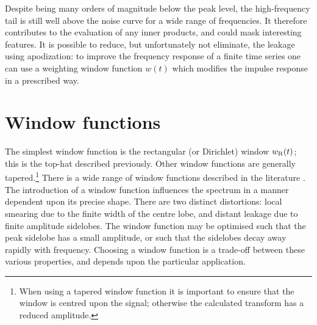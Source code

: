 Despite being many orders of magnitude below the peak level, the high-frequency tail is still well above the noise curve for a wide range of frequencies. It therefore contributes to the evaluation of any inner products, and could mask interesting features. It is possible to reduce, but unfortunately not eliminate, the leakage using apodization: to improve the frequency response of a finite time series one can use a weighting window function $w(t)$ which modifies the impulse response in a prescribed way.

\section{Window functions}

The simplest window function is the rectangular (or Dirichlet) window $w_\mathrm{R}(t)$; this is the top-hat described previously. Other window functions are generally tapered.\footnote{When using a tapered window function it is important to ensure that the window is centred upon the signal; otherwise the calculated transform has a reduced amplitude.} There is a wide range of window functions described in the literature \citep{Harris1978,Kaiser1980,Nuttall1981,McKechan2010}. The introduction of a window function influences the spectrum in a manner dependent upon its precise shape. There are two distinct distortions: local smearing due to the finite width of the centre lobe, and distant leakage due to finite amplitude sidelobes. The window function may be optimised such that the peak sidelobe has a small amplitude, or such that the sidelobes decay away rapidly with frequency. Choosing a window function is a trade-off between these various properties, and depends upon the particular application.

